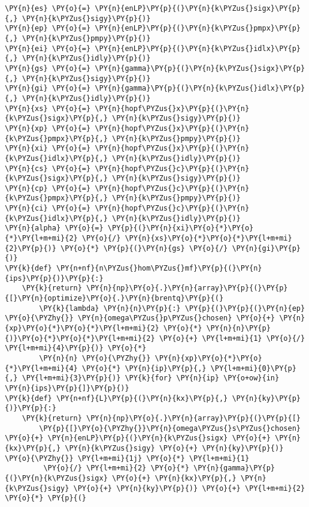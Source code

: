 \begin{Verbatim}[commandchars=\\\{\}]
\PY{n}{es} \PY{o}{=} \PY{n}{enLP}\PY{p}{(}\PY{n}{k\PYZus{}sigx}\PY{p}{,} \PY{n}{k\PYZus{}sigy}\PY{p}{)}
\PY{n}{ep} \PY{o}{=} \PY{n}{enLP}\PY{p}{(}\PY{n}{k\PYZus{}pmpx}\PY{p}{,} \PY{n}{k\PYZus{}pmpy}\PY{p}{)}
\PY{n}{ei} \PY{o}{=} \PY{n}{enLP}\PY{p}{(}\PY{n}{k\PYZus{}idlx}\PY{p}{,} \PY{n}{k\PYZus{}idly}\PY{p}{)}
\PY{n}{gs} \PY{o}{=} \PY{n}{gamma}\PY{p}{(}\PY{n}{k\PYZus{}sigx}\PY{p}{,} \PY{n}{k\PYZus{}sigy}\PY{p}{)}
\PY{n}{gi} \PY{o}{=} \PY{n}{gamma}\PY{p}{(}\PY{n}{k\PYZus{}idlx}\PY{p}{,} \PY{n}{k\PYZus{}idly}\PY{p}{)}
\PY{n}{xs} \PY{o}{=} \PY{n}{hopf\PYZus{}x}\PY{p}{(}\PY{n}{k\PYZus{}sigx}\PY{p}{,} \PY{n}{k\PYZus{}sigy}\PY{p}{)}
\PY{n}{xp} \PY{o}{=} \PY{n}{hopf\PYZus{}x}\PY{p}{(}\PY{n}{k\PYZus{}pmpx}\PY{p}{,} \PY{n}{k\PYZus{}pmpy}\PY{p}{)}
\PY{n}{xi} \PY{o}{=} \PY{n}{hopf\PYZus{}x}\PY{p}{(}\PY{n}{k\PYZus{}idlx}\PY{p}{,} \PY{n}{k\PYZus{}idly}\PY{p}{)}
\PY{n}{cs} \PY{o}{=} \PY{n}{hopf\PYZus{}c}\PY{p}{(}\PY{n}{k\PYZus{}sigx}\PY{p}{,} \PY{n}{k\PYZus{}sigy}\PY{p}{)}
\PY{n}{cp} \PY{o}{=} \PY{n}{hopf\PYZus{}c}\PY{p}{(}\PY{n}{k\PYZus{}pmpx}\PY{p}{,} \PY{n}{k\PYZus{}pmpy}\PY{p}{)}
\PY{n}{ci} \PY{o}{=} \PY{n}{hopf\PYZus{}c}\PY{p}{(}\PY{n}{k\PYZus{}idlx}\PY{p}{,} \PY{n}{k\PYZus{}idly}\PY{p}{)}
\PY{n}{alpha} \PY{o}{=} \PY{p}{(}\PY{n}{xi}\PY{o}{*}\PY{o}{*}\PY{l+m+mi}{2} \PY{o}{/} \PY{n}{xs}\PY{o}{*}\PY{o}{*}\PY{l+m+mi}{2}\PY{p}{)} \PY{o}{*} \PY{p}{(}\PY{n}{gs} \PY{o}{/} \PY{n}{gi}\PY{p}{)}
\PY{k}{def} \PY{n+nf}{n\PYZus{}hom\PYZus{}mf}\PY{p}{(}\PY{n}{ips}\PY{p}{)}\PY{p}{:}
    \PY{k}{return} \PY{n}{np}\PY{o}{.}\PY{n}{array}\PY{p}{(}\PY{p}{[}\PY{n}{optimize}\PY{o}{.}\PY{n}{brentq}\PY{p}{(}
        \PY{k}{lambda} \PY{n}{n}\PY{p}{:} \PY{p}{(}\PY{p}{(}\PY{n}{ep} \PY{o}{\PYZhy{}} \PY{n}{omega\PYZus{}p\PYZus{}chosen} \PY{o}{+} \PY{n}{xp}\PY{o}{*}\PY{o}{*}\PY{l+m+mi}{2} \PY{o}{*} \PY{n}{n}\PY{p}{)}\PY{o}{*}\PY{o}{*}\PY{l+m+mi}{2} \PY{o}{+} \PY{l+m+mi}{1} \PY{o}{/} \PY{l+m+mi}{4}\PY{p}{)} \PY{o}{*}
        \PY{n}{n} \PY{o}{\PYZhy{}} \PY{n}{xp}\PY{o}{*}\PY{o}{*}\PY{l+m+mi}{4} \PY{o}{*} \PY{n}{ip}\PY{p}{,} \PY{l+m+mi}{0}\PY{p}{,} \PY{l+m+mi}{3}\PY{p}{)} \PY{k}{for} \PY{n}{ip} \PY{o+ow}{in} \PY{n}{ips}\PY{p}{]}\PY{p}{)}
\PY{k}{def} \PY{n+nf}{L}\PY{p}{(}\PY{n}{kx}\PY{p}{,} \PY{n}{ky}\PY{p}{)}\PY{p}{:}
    \PY{k}{return} \PY{n}{np}\PY{o}{.}\PY{n}{array}\PY{p}{(}\PY{p}{[}
        \PY{p}{[}\PY{o}{\PYZhy{}}\PY{n}{omega\PYZus{}s\PYZus{}chosen} \PY{o}{+} \PY{n}{enLP}\PY{p}{(}\PY{n}{k\PYZus{}sigx} \PY{o}{+} \PY{n}{kx}\PY{p}{,} \PY{n}{k\PYZus{}sigy} \PY{o}{+} \PY{n}{ky}\PY{p}{)} \PY{o}{\PYZhy{}} \PY{l+m+mi}{1j} \PY{o}{*} \PY{l+m+mi}{1}
         \PY{o}{/} \PY{l+m+mi}{2} \PY{o}{*} \PY{n}{gamma}\PY{p}{(}\PY{n}{k\PYZus{}sigx} \PY{o}{+} \PY{n}{kx}\PY{p}{,} \PY{n}{k\PYZus{}sigy} \PY{o}{+} \PY{n}{ky}\PY{p}{)} \PY{o}{+} \PY{l+m+mi}{2} \PY{o}{*} \PY{p}{(}

\end{Verbatim}
